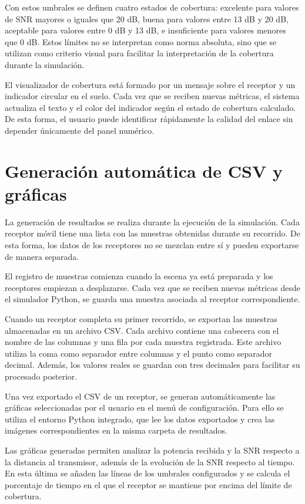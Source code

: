 Con estos umbrales se definen cuatro estados de cobertura: excelente para valores de SNR mayores o iguales que 20 dB, buena para valores entre 13 dB y 20 dB, aceptable para valores entre 0 dB y 13 dB, e insuficiente para valores menores que 0 dB. Estos límites no se interpretan como norma absoluta, sino que se utilizan como criterio visual para facilitar la interpretación de la cobertura durante la simulación.

El visualizador de cobertura está formado por un mensaje sobre el receptor y un indicador circular en el suelo. Cada vez que se reciben nuevas métricas, el sistema actualiza el texto y el color del indicador según el estado de cobertura calculado. De esta forma, el usuario puede identificar rápidamente la calidad del enlace sin depender únicamente del panel numérico.

\section{Generación automática de CSV y gráficas}

La generación de resultados se realiza durante la ejecución de la simulación. Cada receptor móvil tiene una lista con las muestras obtenidas durante su recorrido. De esta forma, los datos de los receptores no se mezclan entre sí y pueden exportarse de manera separada.

El registro de muestras comienza cuando la escena ya está preparada y los receptores empiezan a desplazarse. Cada vez que se reciben nuevas métricas desde el simulador Python, se guarda una muestra asociada al receptor correspondiente. 

Cuando un receptor completa su primer recorrido, se exportan las muestras almacenadas en un archivo CSV. Cada archivo contiene una cabecera con el nombre de las columnas y una fila por cada muestra registrada. Este archivo utiliza la coma como separador entre columnas y el punto como separador decimal. Además, los valores reales se guardan con tres decimales para facilitar su procesado posterior.

Una vez exportado el CSV de un receptor, se generan automáticamente las gráficas seleccionadas por el usuario en el menú de configuración. Para ello se utiliza el entorno Python integrado, que lee los datos exportados y crea las imágenes correspondientes en la misma carpeta de resultados.

Las gráficas generadas permiten analizar la potencia recibida y la SNR respecto a la distancia al transmisor, además de la evolución de la SNR respecto al tiempo. En esta última se añaden las líneas de los umbrales configurados y se calcula el porcentaje de tiempo en el que el receptor se mantiene por encima del límite de cobertura.

